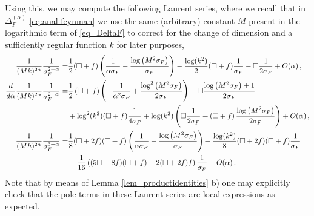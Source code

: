 \documentclass[a4paper,10pt,twoside]{article}
\numberwithin{equation}{section}
\newcounter{and}
\theoremstyle{plain}
\theoremstyle{definition}
\begin{document}
 
 Using this, we may compute the following Laurent series, where we recall that in $\Delta^{(\alpha)}_F$ \eqref{eq:anal-feynman} we use the same (arbitrary) constant $M$ present in the logarithmic term  of \eqref{eq_DeltaF} to correct for the change of dimension and a sufficiently regular function $k$ for later purposes,
\begin{align}\frac{1}{(Mk)^{2\alpha}}\frac{1}{\sigma^{2+\alpha}_F}=&\frac{1}{2}(\Box+f)\left(\frac{1}{\alpha\sigma_F}-\frac{\log \left(M^2 \sigma_F\right)}{\sigma_F}\right)-\frac{\log(k^2)}{2}(\Box+f)\frac{1}{\sigma_F}-\Box \frac{1}{2\sigma_F}+O(\alpha)\,,\notag\\
\label{eq_generalexpansion}\frac{d}{d\alpha}\frac{1}{(Mk)^{2\alpha}}\frac{1}{\sigma^{2+\alpha}_F}=&\frac12\left(\Box+f\right)\left(-\frac{1}{\alpha^2 \sigma_F}+\frac{\log^2 \left(M^2 \sigma_F\right)}{2\sigma_F}\right)+\Box\frac{\log \left(M^2 \sigma_F\right)+1}{2\sigma_F}\\&+\log^2(k^2)(\Box+f)\frac{1}{4\sigma_F}+\log(k^2)\left(\Box\frac{1}{2\sigma_F}+\left(\Box+f\right)\frac{\log \left(M^2\sigma_F\right)}{2\sigma_F}\right)+O(\alpha)\,,\notag\\
\frac{1}{(M h)^{2\alpha}}\frac{1}{\sigma^{3+\alpha}_F}=&\frac{1}{8}(\Box+2f)(\Box+f)\left(\frac{1}{\alpha\sigma_F}-\frac{\log \left(M^2 \sigma_F\right)}{\sigma_F}\right)-\frac{\log(k^2)}{8}(\Box+2f)(\Box+f)\frac{1}{\sigma_F}\notag\\&-\frac{1}{16} \left((5\Box+8f)(\Box+f)-2(\Box+2f)f\right) \frac{1}{\sigma_F}+O(\alpha)\,.\notag\end{align}
Note that by means of Lemma \ref{lem_productidentities} b) one may explicitly check that the pole terms in these Laurent series are local expressions as expected.
\end{document}
